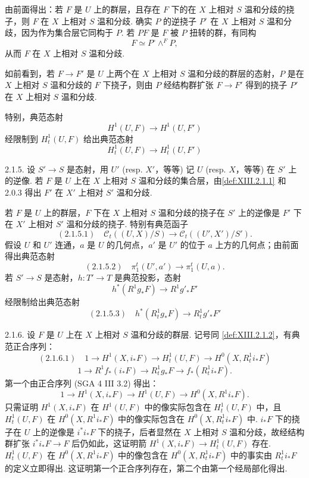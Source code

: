 由前面得出：若 $F$ 是 $U$ 上的群层，且存在 $F$ 下的在 $X$ 上相对 $S$ 温和分歧的挠子，则 $F$ 在 $X$ 上相对 $S$ 温和分歧. 确实 $P$ 的逆挠子 $P^{\circ}$ 在 $X$ 上相对 $S$ 温和分歧，因为作为集合层它同构于 $P$. 若 $P F$ 是 $F$ 被 $P$ 扭转的群，有同构
\[
F \simeq P^{\circ} \wedge^F P,
\]
从而 $F$ 在 $X$ 上相对 $S$ 温和分歧.

如前看到，若 $F \to F'$ 是 $U$ 上两个在 $X$ 上相对 $S$ 温和分歧的群层的态射，$P$ 是在 $X$ 上相对 $S$ 温和分歧的 $F$ 下挠子，则由 $P$ 经结构群扩张 $F \to F'$ 得到的挠子 $P'$ 在 $X$ 上相对 $S$ 温和分歧.

特别，典范态射
\[
H^1(U, F) \longrightarrow H^1(U, F')
\]
经限制到 $H^1_t(U, F)$ 给出典范态射
\[
H^1_t(U, F) \longrightarrow H^1_t(U, F')
\]

2.1.5. 设 $S' \to S$ 是态射，用 $U'$ (resp. $X'$，等等) 记 $U$ (resp. $X$，等等) 在 $S'$ 上的逆像. 若 $F$ 是 $U$ 上在 $X$ 上相对 $S$ 温和分歧的集合层，由\cref{def:XIII.2.1.1} 和 2.0.3 得出 $F'$ 在 $X'$ 上相对 $S'$ 温和分歧.

若 $F$ 是 $U$ 上的群层，$F$ 下在 $X$ 上相对 $S$ 温和分歧的挠子在 $S'$ 上的逆像是 $F'$ 下在 $X'$ 上相对 $S'$ 温和分歧的挠子. 特别有典范函子
\[
(2.1.5.1) \quad \mathcal{C}_t((U, X)/S) \longrightarrow \mathcal{C}_t((U', X')/S').
\]
假设 $U$ 和 $U'$ 连通，$a$ 是 $U$ 的几何点，$a'$ 是 $U'$ 的位于 $a$ 上方的几何点；由前面得出典范态射
\[
(2.1.5.2) \quad \pi^t_1(U', a') \longrightarrow \pi^t_1(U, a).
\]
若 $S' \to S$ 是态射，$h \colon T' \to T$ 是典范投影，态射
\[
h^{*}(R^1 g_* F) \longrightarrow R^1 g'_* F'
\]
经限制给出典范态射
\[
(2.1.5.3) \quad h^{*}(R^1_t g_* F) \longrightarrow R^1_t g'_* F'
\]

2.1.6. 设 $F$ 是 $U$ 上在 $X$ 上相对 $S$ 温和分歧的群层. 记号同 \ref{def:XIII.2.1.2}，有典范正合序列：
\[
(2.1.6.1) \quad 1 \longrightarrow H^1(X, i_* F) \longrightarrow H^1_t(U, F) \longrightarrow H^0(X, R^1_t i_* F)
\]
\[
1 \longrightarrow R^1 f_*(i_* F) \longrightarrow R^1_t g_* F \longrightarrow f_*(R^1_t i_* F).
\]
第一个由正合序列 (SGA 4 III 3.2) 得出：
\[
1 \longrightarrow H^1(X, i_* F) \longrightarrow H^1(U, F) \longrightarrow H^0(X, R^1 i_* F).
\]
只需证明 $H^1(X, i_* F)$ 在 $H^1(U, F)$ 中的像实际包含在 $H^1_t(U, F)$ 中，且 $H^1_t(U, F)$ 在 $H^0(X, R^1 i_* F)$ 中的像实际包含在 $H^0(X, R^1_t i_* F)$ 中. $i_* F$ 下的挠子在 $U$ 上的逆像是 $i^{*} i_* F$ 下的挠子，后者显然在 $X$ 上相对 $S$ 温和分歧，故经结构群扩张 $i^{*} i_* F \to F$ 后仍如此，这证明箭 $H^1(X, i_* F) \to H^1_t(U, F)$ 存在. $H^1_t(U, F)$ 在 $H^0(X, R^1 i_* F)$ 中的像包含在 $H^0(X, R^1_t i_* F)$ 中的事实由 $R^1_t i_* F$ 的定义立即得出. 这证明第一个正合序列存在，第二个由第一个经局部化得出.

